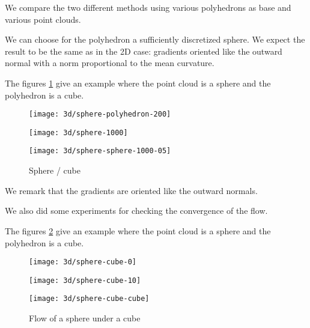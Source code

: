 
We compare the two different methods using various polyhedrons as base and
various point clouds.

We can choose for the polyhedron a sufficiently discretized sphere. We expect
the result to be the same as in the 2D case: gradients oriented like the outward
normal with a norm proportional to the mean curvature.

The figures \ref{fig:3d-mean-curvature-sphere-cube} give an example where the
point cloud is a sphere and the polyhedron is a cube.

\begin{figure}[h]
    \centering
    \begin{minipage}{0.32\linewidth}
        \centering
        \texttt{[image: 3d/sphere-polyhedron-200]}
    \end{minipage}
    \begin{minipage}{0.32\linewidth}
        \centering
        \texttt{[image: 3d/sphere-1000]}
    \end{minipage}
    \begin{minipage}{0.32\linewidth}
        \centering
        \texttt{[image: 3d/sphere-sphere-1000-05]}
    \end{minipage}
    \caption{Sphere / cube}
    \label{fig:3d-mean-curvature-sphere-cube}
\end{figure}
We remark that the gradients are oriented like the outward normals.

We also did some experiments for checking the convergence of the flow.

The figures \ref{fig:3d-flow-sphere-cube} give an example where the point cloud
is a sphere and the polyhedron is a cube.

\begin{figure}[h]
    \centering
    \begin{minipage}{0.32\linewidth}
        \centering
        \texttt{[image: 3d/sphere-cube-0]}
    \end{minipage}
    \begin{minipage}{0.32\linewidth}
        \centering
        \texttt{[image: 3d/sphere-cube-10]}
    \end{minipage}
    \begin{minipage}{0.32\linewidth}
        \centering
        \texttt{[image: 3d/sphere-cube-cube]}
    \end{minipage}

    \caption{Flow of a sphere under a cube}
    \label{fig:3d-flow-sphere-cube}
\end{figure}

